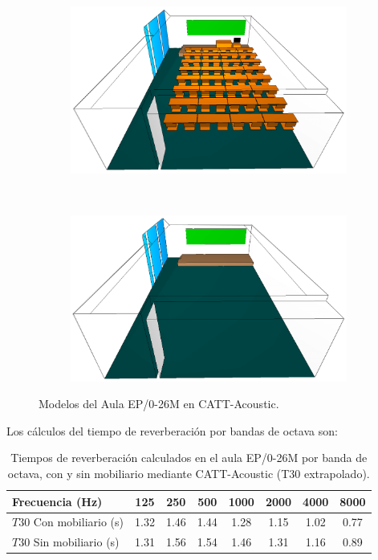 \begin{figure}[H]
    \centering
    \begin{subfigure}[b]{0.4\textwidth}
    	\centering
        \includegraphics[width=0.9\linewidth]{archivos/capturas/epsllenacatt.png}
    \end{subfigure}
    ~ %
    \begin{subfigure}[b]{0.4\textwidth}
    	\centering
        \includegraphics[width=0.9\linewidth]{archivos/capturas/epsvaciacatt.png}
    \end{subfigure}
    \caption{Modelos del Aula EP/0-26M en CATT-Acoustic.}\label{modeloepscatt}
    \vspace{-0.3cm}
\end{figure}


Los cálculos del tiempo de reverberación por bandas de octava son:

\begin{table}[ht]
\centering
{
\begin{tabular}{@{}lccccccc@{}}
\toprule
Frecuencia (Hz) & 125 & 250 & 500 & 1000 & 2000 & 4000 & 8000 \\ \midrule
$T30$ Con mobiliario (s) & 1.32 & 1.46 & 1.44 & 1.28 & 1.15 & 1.02 & 0.77 \\
$T30$ Sin mobiliario (s) & 1.31 & 1.56 & 1.54 & 1.46 & 1.31 & 1.16 & 0.89 \\ \bottomrule
\end{tabular}
}
\caption{Tiempos de reverberación calculados en el aula EP/0-26M por banda de octava, con y sin mobiliario mediante CATT-Acoustic (T30 extrapolado).}
\label{tab:revepscatt}
\vspace{-0.3cm}
\end{table}
\FloatBarrier

